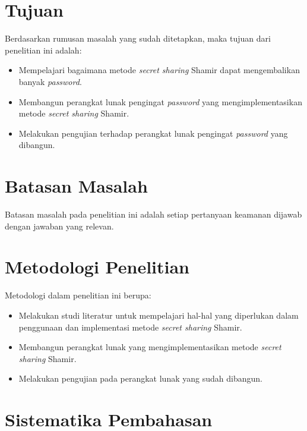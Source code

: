 \section{Tujuan}
\label{sec:tujuan}

Berdasarkan rumusan masalah yang sudah ditetapkan, maka tujuan dari penelitian ini adalah:
\begin{itemize}
	\item Mempelajari bagaimana metode \textit{secret sharing} Shamir dapat mengembalikan banyak \textit{password}.
	\item Membangun perangkat lunak pengingat \textit{password} yang mengimplementasikan metode \textit{secret sharing} Shamir.
	\item Melakukan pengujian terhadap perangkat lunak pengingat \textit{password} yang dibangun.
\end{itemize}

\section{Batasan Masalah}
\label{sec:batasanmasalah}

Batasan masalah pada penelitian ini adalah setiap pertanyaan keamanan dijawab dengan jawaban yang relevan.

\section{Metodologi Penelitian}
\label{sec:metodologi penelitian}

Metodologi dalam penelitian ini berupa:
\begin{itemize}
	\item Melakukan studi literatur untuk mempelajari hal-hal yang diperlukan dalam penggunaan dan implementasi metode \textit{secret sharing} Shamir.
	\item Membangun perangkat lunak yang mengimplementasikan metode \textit{secret sharing} Shamir.
	\item Melakukan pengujian pada perangkat lunak yang sudah dibangun.
\end{itemize}

\section{Sistematika Pembahasan}
\label{sec:sistematikapembahasan}

